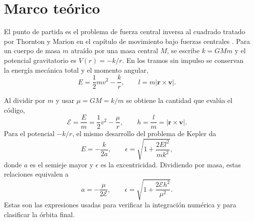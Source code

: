 \documentclass[12pt]{article}
\begin{document}
\section{Marco teórico}

El punto de partida es el problema de fuerza central inversa al cuadrado
tratado por Thornton y Marion en el capítulo de movimiento bajo fuerzas
centrales \cite{thornton2003}. Para un cuerpo de masa $m$ atraído por una masa
central $M$, se escribe $k=GMm$ y el potencial gravitatorio es
$V(r)=-k/r$. En los tramos sin impulso se conservan la energía mecánica total
y el momento angular,
\begin{equation}
  E=\frac{1}{2}m v^2-\frac{k}{r}, \qquad
  l=m|\mathbf r\times\mathbf v|.
\end{equation}

Al dividir por $m$ y usar $\mu=GM=k/m$ se obtiene la
cantidad que evalúa el código,
\begin{equation}
  \mathcal E=\frac{E}{m}
  =\frac{1}{2}v^2-\frac{\mu}{r}, \qquad
  h=\frac{l}{m}=|\mathbf r\times\mathbf v|.
\end{equation}
Para el potencial $-k/r$, el mismo desarrollo
del problema de Kepler da
\begin{equation}
  E=-\frac{k}{2a}, \qquad
  \epsilon=\sqrt{1+\frac{2El^2}{m k^2}},
\end{equation}
donde $a$ es el semieje mayor y $\epsilon$ es la excentricidad. Dividiendo por
masa, estas relaciones equivalen a
\begin{equation}
  a=-\frac{\mu}{2\mathcal E}, \qquad
  \epsilon=\sqrt{1+\frac{2\mathcal E h^2}{\mu^2}} .
\end{equation}
Estas son las expresiones usadas para verificar la integración numérica y para
clasificar la órbita final.
\end{document}
